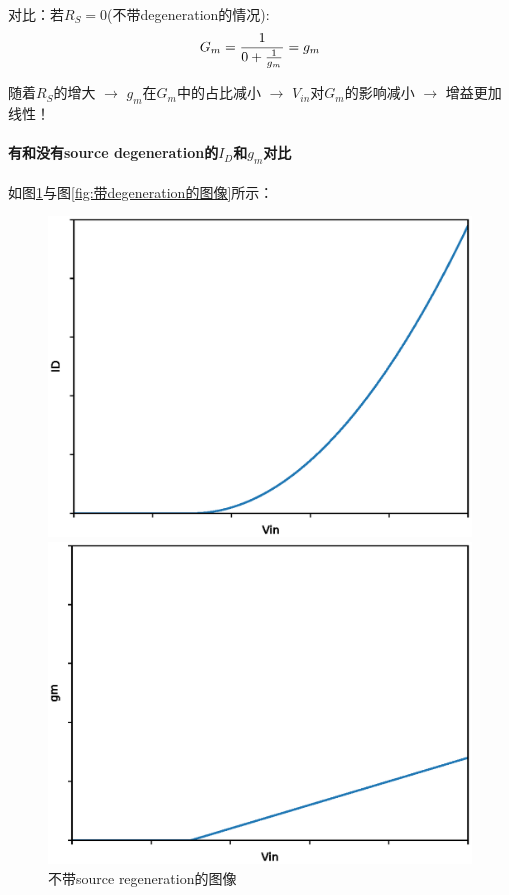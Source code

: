 \documentclass[twoside,a4paper,openright,titlepage,draft]{ctexrep}
\begin{document}
对比：若$R_S = 0$(不带degeneration的情况):
\begin{equation}
    G_m = \frac{1}{0 + {1 \over g_m}} = g_m
\end{equation}

随着$R_S$的增大 $\rightarrow$ $g_m$在$G_m$中的占比减小 $\rightarrow$ $V_{in}$对$G_m$的影响减小 $\rightarrow$ 增益更加线性！

\paragraph{有和没有source degeneration的$I_D$和$g_m$对比\\}
如图\ref{fig:不带degeneration的图像}与图\ref{fig:带degeneration的图像}所示：
\begin{figure}[H]
    \centering
    \begin{minipage}{0.49\linewidth}
        \centering
        \includegraphics[width=\linewidth]{nodegeneration1.eps}
    \end{minipage}
    \begin{minipage}{0.49\linewidth}
        \centering
        \includegraphics[width=\linewidth]{nodegeneration2.eps}
    \end{minipage}
    \caption{不带source regeneration的图像}
    \label{fig:不带degeneration的图像}
\end{figure}
\end{document}
